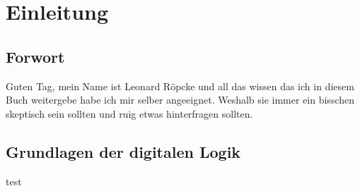 \chapter{Einleitung}
\section{Forwort}
Guten Tag, mein Name ist Leonard Röpcke und all das wissen das ich in diesem Buch weitergebe habe ich mir selber angeeignet. 
Weshalb sie immer ein bisschen skeptisch sein sollten und ruig etwas hinterfragen sollten.


\section{Grundlagen der digitalen Logik}
test 
